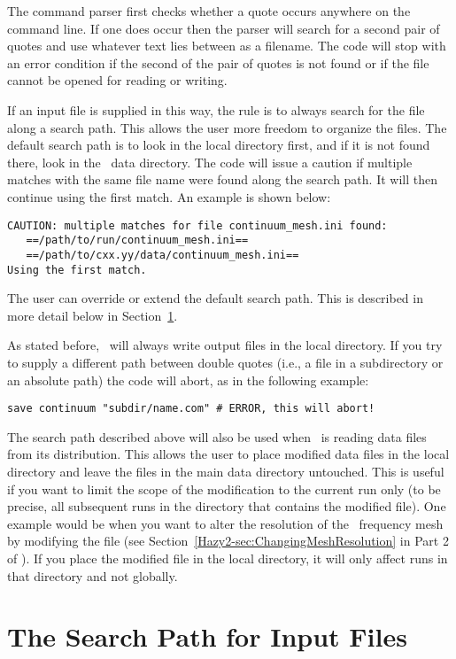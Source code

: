 The command parser first checks whether a quote occurs anywhere on the
command line.  If one does occur then the parser will search for a second
pair of quotes and use whatever text lies between as a filename.  The code
will stop with an error condition if the second of the pair of quotes is
not found or if the file cannot be opened for reading or writing.

If an input file is supplied in this way, the rule is to always search for the
file along a search path. This allows the user more freedom to organize the
files. The default search path is to look in the local directory first, and if
it is not found there, look in the \Cloudy\ data directory. The code will
issue a caution if multiple matches with the same file name were found along
the search path. It will then continue using the first match. An example is
shown below:
\begin{verbatim}
CAUTION: multiple matches for file continuum_mesh.ini found:
   ==/path/to/run/continuum_mesh.ini==
   ==/path/to/cxx.yy/data/continuum_mesh.ini==
Using the first match.
\end{verbatim}
The user can override or extend the default search path. This is described in
more detail below in Section~\ref{sec:SearchPath}.

As stated before, \Cloudy\ will always write output files in the local
directory. If you try to supply a different path between double quotes (i.e.,
a file in a subdirectory or an absolute path) the code will abort, as in the
following example:
\begin{verbatim}
save continuum "subdir/name.com" # ERROR, this will abort!
\end{verbatim}

The search path described above will also be used when \Cloudy\ is reading
data files from its distribution. This allows the user to place modified data
files in the local directory and leave the files in the main data directory
untouched. This is useful if you want to limit the scope of the modification
to the current run only (to be precise, all subsequent runs in the directory
that contains the modified file). One example would be when you want to alter
the resolution of the \Cloudy\ frequency mesh by modifying the file
 (see
Section~\ref{Hazy2-sec:ChangingMeshResolution} in Part 2 of \Hazy). If you
place the modified file in the local directory, it will only affect runs in
that directory and not globally.

\section{The Search Path for Input Files}
\label{sec:SearchPath}

